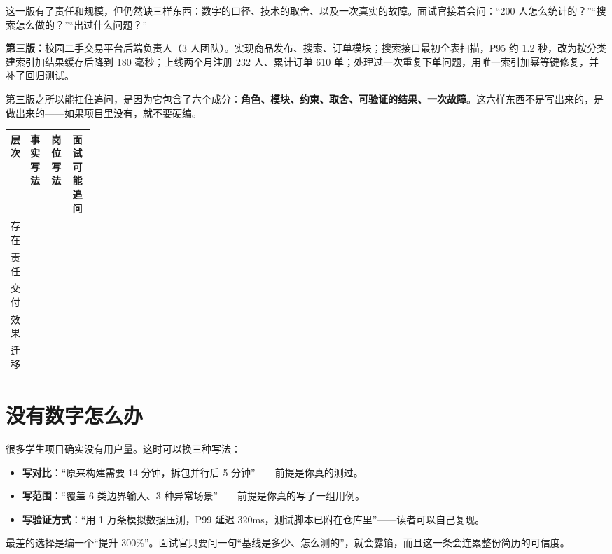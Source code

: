 \documentclass[UTF8,zihao=5,openany]{ctexbook}
\begin{document}
这一版有了责任和规模，但仍然缺三样东西：数字的口径、技术的取舍、以及一次真实的故障。面试官接着会问：“200 人怎么统计的？”“搜索怎么做的？”“出过什么问题？”

\begin{casebox}
\textbf{第三版：}校园二手交易平台后端负责人（3 人团队）。实现商品发布、搜索、订单模块；搜索接口最初全表扫描，P95 约 1.2 秒，改为按分类建索引加结果缓存后降到 180 毫秒；上线两个月注册 232 人、累计订单 610 单；处理过一次重复下单问题，用唯一索引加幂等键修复，并补了回归测试。
\end{casebox}

第三版之所以能扛住追问，是因为它包含了六个成分：\textbf{角色、模块、约束、取舍、可验证的结果、一次故障}。这六样东西不是写出来的，是做出来的——如果项目里没有，就不要硬编。

\begin{toolbox}
\begin{center}\small
\begin{tabularx}{0.94\linewidth}{p{0.14\linewidth}YYY}
\toprule
层次 & 事实写法 & 岗位写法 & 面试可能追问 \\
\midrule
存在 & & & \\
责任 & & & \\
交付 & & & \\
效果 & & & \\
迁移 & & & \\
\bottomrule
\end{tabularx}
\end{center}
\end{toolbox}

\section{没有数字怎么办}
很多学生项目确实没有用户量。这时可以换三种写法：

\begin{itemize}
\item \textbf{写对比}：“原来构建需要 14 分钟，拆包并行后 5 分钟”——前提是你真的测过。
\item \textbf{写范围}：“覆盖 6 类边界输入、3 种异常场景”——前提是你真的写了一组用例。
\item \textbf{写验证方式}：“用 1 万条模拟数据压测，P99 延迟 320ms，测试脚本已附在仓库里”——读者可以自己复现。
\end{itemize}

最差的选择是编一个“提升 300\%”。面试官只要问一句“基线是多少、怎么测的”，就会露馅，而且这一条会连累整份简历的可信度。
\end{document}
